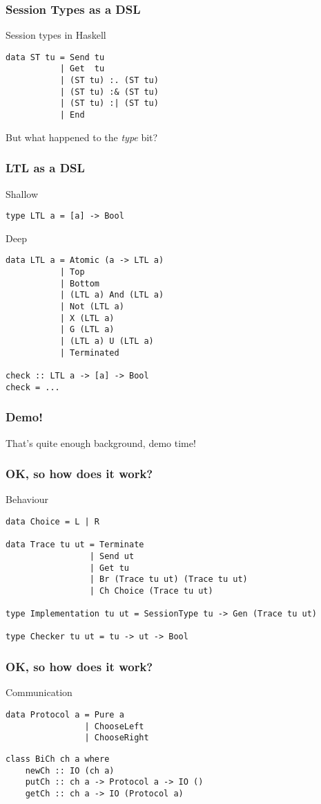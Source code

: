 \documentclass{beamer}
\begin{document}
\begin{frame}[fragile]
    \frametitle{Session Types as a DSL}
    \large{Session types in Haskell}
    \\
    \begin{verbatim}
data ST tu = Send tu
           | Get  tu
           | (ST tu) :. (ST tu)
           | (ST tu) :& (ST tu)
           | (ST tu) :| (ST tu)
           | End
    \end{verbatim}
    \pause
    But what happened to the \textit{type} bit?
\end{frame}

\begin{frame}[fragile]
    \frametitle{LTL as a DSL}
    \centering
    Shallow
    \begin{verbatim}
type LTL a = [a] -> Bool
    \end{verbatim}
    \pause
    \centering
    Deep
    \begin{verbatim}
data LTL a = Atomic (a -> LTL a)
           | Top 
           | Bottom
           | (LTL a) And (LTL a)
           | Not (LTL a)
           | X (LTL a)
           | G (LTL a)
           | (LTL a) U (LTL a)
           | Terminated

check :: LTL a -> [a] -> Bool
check = ...
    \end{verbatim}
\end{frame}

\begin{frame}
    \frametitle{Demo!}
    \Large{That's quite enough background, demo time!}
\end{frame}

\begin{frame}[fragile]
    \frametitle{OK, so how does it work?}
    \centering
    \Large{Behaviour}
    \small{
    \begin{verbatim}
data Choice = L | R

data Trace tu ut = Terminate
                 | Send ut
                 | Get tu
                 | Br (Trace tu ut) (Trace tu ut)
                 | Ch Choice (Trace tu ut)

type Implementation tu ut = SessionType tu -> Gen (Trace tu ut)

type Checker tu ut = tu -> ut -> Bool
    \end{verbatim}
}
\end{frame}

\begin{frame}[fragile]
    \frametitle{OK, so how does it work?}
    \centering
    \Large{Communication}
    \begin{verbatim}
data Protocol a = Pure a
                | ChooseLeft
                | ChooseRight
    \end{verbatim}
    \begin{verbatim}
class BiCh ch a where
    newCh :: IO (ch a)
    putCh :: ch a -> Protocol a -> IO ()
    getCh :: ch a -> IO (Protocol a)
    \end{verbatim}
\end{frame}
\end{document}
